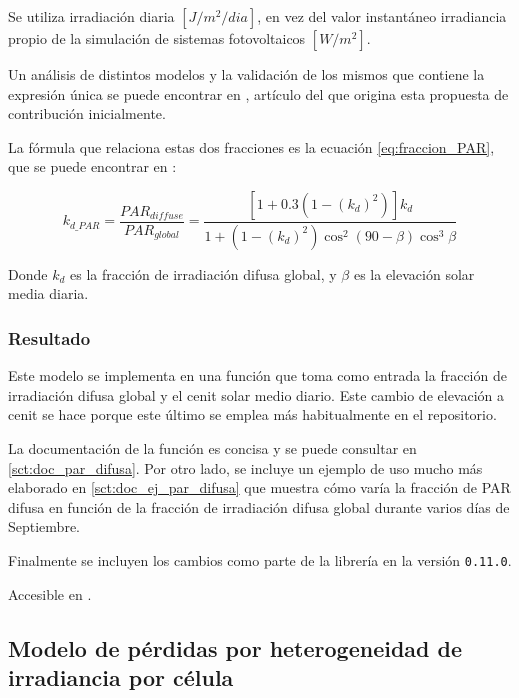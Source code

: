 Se utiliza irradiación diaria $[J/m^2/dia]$, en vez del valor instantáneo irradiancia propio de la simulación de sistemas fotovoltaicos $[W/m^2]$.

Un análisis de distintos modelos y la validación de los mismos que contiene la expresión única se puede encontrar en \cite{Ma_Lu_Zainali_Stridh_Avelin_Amaducci_Colauzzi_Campana_2022}, artículo del que origina esta propuesta de contribución inicialmente.

La fórmula que relaciona estas dos fracciones es la ecuación \ref{eq:fraccion_PAR}, que se puede encontrar en \cite{Spitters_1986}:

\begin{equation} \label{eq:fraccion_PAR}
    k_{d\_PAR} = \frac{PAR_{diffuse}}{PAR_{global}} = \frac{\left[1 + 0.3 \left(1 - \left(k_d\right) ^2\right)\right] k_d}
    {1 + \left(1 - \left(k_d\right)^2\right) \cos ^2 (90 - \beta) \cos ^3 \beta}
\end{equation}

Donde $k_d$ es la fracción de irradiación difusa global, y $\beta$ es la elevación solar media diaria.

\subsubsection{Resultado}

Este modelo se implementa en una función que toma como entrada la fracción de irradiación difusa global y el cenit solar medio diario. Este cambio de elevación a cenit se hace porque este último se emplea más habitualmente en el repositorio.

La documentación de la función es concisa y se puede consultar en \ref{sct:doc_par_difusa}. Por otro lado, se incluye un ejemplo de uso mucho más elaborado en \ref{sct:doc_ej_par_difusa} que muestra cómo varía la fracción de PAR difusa en función de la fracción de irradiación difusa global durante varios días de Septiembre.

Finalmente se incluyen los cambios como parte de la librería en la versión \texttt{0.11.0}.

Accesible en .

\subsection{Modelo de pérdidas por heterogeneidad de irradiancia por célula} \label{sct:desarrollo:contribuciones_cientificas:heterogeneidad_irradiancia}

